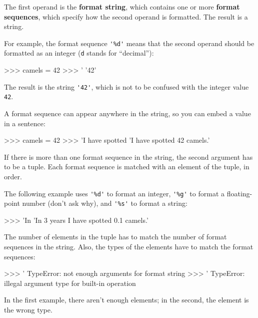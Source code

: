 
The first operand is the {\bf format string}, which contains
one or more {\bf format sequences}, which
specify how
the second operand is formatted.  The result is a string.


For example, the format sequence \verb"'%d'" means that
the second operand should be formatted as an
integer ({\tt d} stands for ``decimal''):

\beforeverb
\begin{pyinterpreter}
>>> camels = 42
>>> '%
'42'
\end{pyinterpreter}
\afterverb
%
The result is the string \verb"'42'", which is not to be confused
with the integer value {\tt 42}.

A format sequence can appear anywhere in the string,
so you can embed a value in a sentence:

\beforeverb
\begin{pyinterpreter}
>>> camels = 42
>>> 'I have spotted %
'I have spotted 42 camels.'
\end{pyinterpreter}
\afterverb
%
If there is more than one format sequence in the string,
the second argument has to be a tuple.  Each format sequence is
matched with an element of the tuple, in order.

The following example uses \verb"'%d'" to format an integer,
\verb"'%g'" to format
a floating-point number (don't ask why), and \verb"'%s'" to format
a string:

\beforeverb
\begin{pyinterpreter}
>>> 'In %
'In 3 years I have spotted 0.1 camels.'
\end{pyinterpreter}
\afterverb
%
The number of elements in the tuple has to match the number
of format sequences in the string.  Also, the types of the
elements have to match the format sequences:


\beforeverb
\begin{pyinterpreter}
>>> '%
TypeError: not enough arguments for format string
>>> '%
TypeError: illegal argument type for built-in operation
\end{pyinterpreter}
\afterverb
%
In the first example, there aren't enough elements; in the
second, the element is the wrong type.


